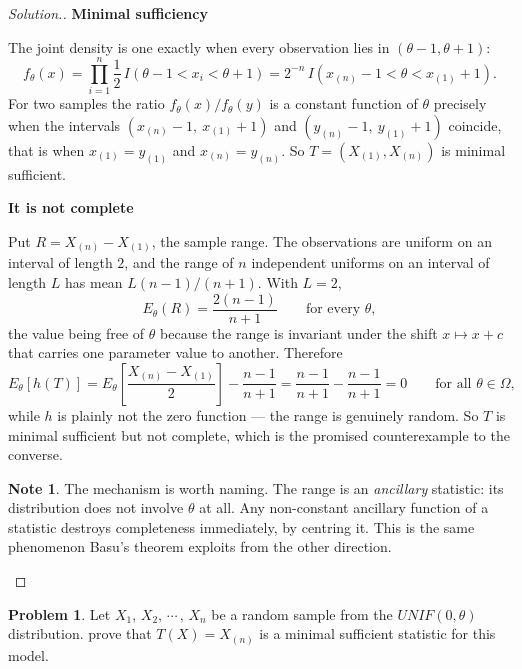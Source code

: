 \documentclass[12pt,a4paper]{report}
\theoremstyle{definition}
\newtheorem*{note}{Note}
\newcommand{\subhead}[1]{%
  \par\medskip\noindent\textbf{#1}\par\nobreak\smallskip}
\newtheorem{problemx}{Problem}[section]
\newenvironment{problem}{\begin{problemx}}{\end{problemx}}
\newenvironment{solution}
  {\renewcommand{\qedsymbol}{}\begin{proof}[\textit{Solution}.]}
  {\end{proof}}
\begin{document}
\begin{solution}
\subhead{Minimal sufficiency}
The joint density is one exactly when every observation lies in
$(\theta-1,\theta+1)$:
\[f_{\theta}(x) = \prod_{i=1}^{n} \frac{1}{2}\,I\left(\theta-1<x_i<\theta+1\right)
= 2^{-n}\,I\left(x_{(n)}-1<\theta<x_{(1)}+1\right).\]
For two samples the ratio $f_{\theta}(x)/f_{\theta}(y)$ is a constant function of
$\theta$ precisely when the intervals
$\left(x_{(n)}-1,\ x_{(1)}+1\right)$ and $\left(y_{(n)}-1,\ y_{(1)}+1\right)$
coincide, that is when $x_{(1)}=y_{(1)}$ and $x_{(n)}=y_{(n)}$. So
$T=\left(X_{(1)},X_{(n)}\right)$ is minimal sufficient.

\subhead{It is not complete}
Put $R = X_{(n)}-X_{(1)}$, the sample range. The observations are uniform on an
interval of length $2$, and the range of $n$ independent uniforms on an interval
of length $L$ has mean $L(n-1)/(n+1)$. With $L=2$,
\[E_{\theta}(R) = \frac{2(n-1)}{n+1}\qquad\text{for every }\theta ,\]
the value being free of $\theta$ because the range is invariant under the shift
$x\mapsto x+c$ that carries one parameter value to another. Therefore
\[E_{\theta}\left[h(T)\right]
= E_{\theta}\left[\frac{X_{(n)}-X_{(1)}}{2}\right] - \frac{n-1}{n+1}
= \frac{n-1}{n+1} - \frac{n-1}{n+1} = 0
\qquad\text{for all }\theta\in\Omega ,\]
while $h$ is plainly not the zero function --- the range is genuinely random. So
$T$ is minimal sufficient but not complete, which is the promised counterexample
to the converse.

\begin{note}
The mechanism is worth naming. The range is an \emph{ancillary} statistic: its
distribution does not involve $\theta$ at all. Any non-constant ancillary
function of a statistic destroys completeness immediately, by centring it. This
is the same phenomenon Basu's theorem exploits from the other direction.
\end{note}
\end{solution}

\begin{problem}
\label{prob:uniformminimal}
Let $X_1, \, X_2, \, \cdots\, , \, X_n$ be a random sample from the $UNIF(0,\theta)$ distribution. prove that $T(X) = X_{(n)}$ is a minimal sufficient statistic for this model.
\end{problem}
\end{document}
